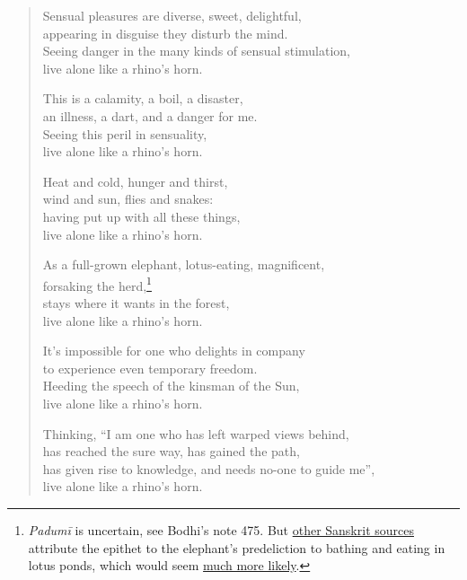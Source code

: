 \documentclass[12pt,openany]{book}%
\begin{document}
\begin{verse}
Sensual pleasures are diverse, sweet, delightful, \\
appearing in disguise they disturb the mind. \\
Seeing danger in the many kinds of sensual stimulation, \\
live alone like a rhino’s horn. 

This is a calamity, a boil, a disaster, \\
an illness, a dart, and a danger for me. \\
Seeing this peril in sensuality, \\
live alone like a rhino’s horn. 

Heat and cold, hunger and thirst, \\
wind and sun, flies and snakes: \\
having put up with all these things, \\
live alone like a rhino’s horn. 

As a full-grown elephant, lotus-eating, magnificent, \\
forsaking the herd,\footnote{\textit{\textsanskrit{Padumī}} is uncertain, see Bodhi’s note 475. But \href{https://books.google.com.au/books?id=99DgDwAAQBAJ\&pg=PT101\&lpg=PT101\&dq=why+is+elephant+called+\%22padmin\%22\&source=bl\&ots=yjtYki1Aiw\&sig=ACfU3U3b{-}nbKLRr9JB93iB\_f0MRm29z45w\&hl=en\&sa=X\&ved=2ahUKEwj317SinfXtAhUzwzgGHWzTCKoQ6AEwAXoECAIQAg\#v=onepage\&q=why\%20is\%20elephant\%20called\%20\%22padmin\%22\&f=false}{other Sanskrit sources} attribute the epithet to the elephant’s predeliction to bathing and eating in lotus ponds, which would seem \href{https://www.agefotostock.com/age/en/Stock{-}Images/Rights{-}Managed/D88{-}2815363}{much more likely}. } \\
stays where it wants in the forest, \\
live alone like a rhino’s horn. 

It’s impossible for one who delights in company \\
to experience even temporary freedom. \\
Heeding the speech of the kinsman of the Sun, \\
live alone like a rhino’s horn. 

Thinking, “I am one who has left warped views behind, \\
has reached the sure way, has gained the path, \\
has given rise to knowledge, and needs no-one to guide me”, \\
live alone like a rhino’s horn. 


\end{verse}
\end{document}
